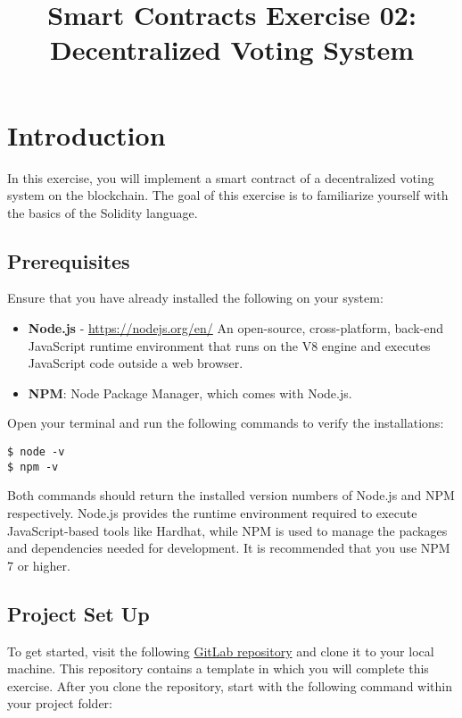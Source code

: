 \documentclass[12pt]{article}
\title{Smart Contracts Exercise 02: \\ Decentralized Voting System}
\author{}
\date{}
\begin{document}
\maketitle
\section{Introduction}

In this exercise, you will implement a smart contract of a decentralized voting system on the blockchain. The goal of this exercise is to familiarize yourself with the basics of the Solidity language.

\subsection{Prerequisites}

Ensure that you have already installed the following on your system:

\begin{itemize}
    \item \textbf{Node.js} - \url{https://nodejs.org/en/}
    An open-source, cross-platform, back-end JavaScript runtime environment that runs on the V8 engine and executes JavaScript code outside a web browser. 
    \item \textbf{NPM}: Node Package Manager, which comes with Node.js.
\end{itemize}

Open your terminal and run the following commands to verify the installations:

\begin{verbatim}
$ node -v
$ npm -v
\end{verbatim}

Both commands should return the installed version numbers of Node.js and NPM respectively. Node.js provides the runtime environment required to execute JavaScript-based tools like Hardhat, while NPM is used to manage the packages and dependencies needed for development. It is recommended that you use NPM 7 or higher.

\subsection{Project Set Up}

To get started, visit the following \href{https://gitlab.fel.cvut.cz/radovluk/smart-contracts-exercises/-/tree/main/02-Decentralized-Voting-System/task/task-code?ref_type=heads}{GitLab repository} and clone it to your local machine. This repository contains a template in which you will complete this exercise. After you clone the repository, start with the following command within your project folder:
\end{document}

